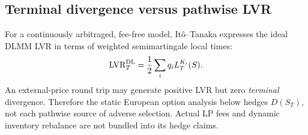 \subsection{Terminal divergence versus pathwise LVR}
For a continuously arbitraged, fee-free model, It\^o--Tanaka expresses the ideal DLMM LVR in terms of weighted semimartingale local times:
\begin{equation}
 \mathrm{LVR}_T^{\mathrm{DL}}=\frac12\sum_i q_i L_T^{K_i}(S).
\label{eq:local-time}
\end{equation}
An external-price round trip may generate positive LVR but zero \emph{terminal} divergence. Therefore the static European option analysis below hedges $D(S_T)$, not each pathwise source of adverse selection. Actual LP fees and dynamic inventory rebalance are not bundled into its hedge claims.
